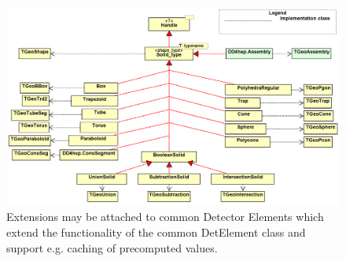 \documentclass[10pt,a4paper]{article}
\begin{document}
\newpage
\begin{figure}[t]
  \begin{center}
    \includegraphics[width=160mm] {DD4hep-solids.png}
    \caption{Extensions may be attached to common Detector Elements which 
             extend the functionality of the common DetElement 
             class and support e.g. caching of precomputed values.}
    \label{fig:dd4hep-solids}
  \end{center}
  \vspace{-0.6cm}
\end{figure}
\end{document}

